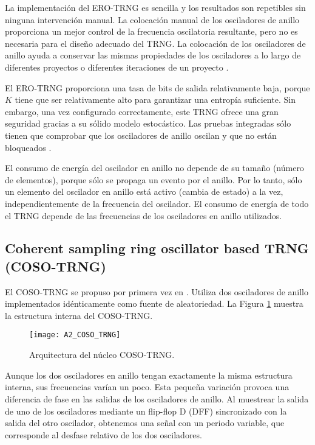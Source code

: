             La implementación del ERO-TRNG es sencilla y los resultados son repetibles sin ninguna intervención manual. La colocación manual de los osciladores de anillo proporciona un mejor control de la frecuencia oscilatoria resultante, pero no es necesaria para el diseño adecuado del TRNG. La colocación de los osciladores de anillo ayuda a conservar las mismas propiedades de los osciladores a lo largo de diferentes proyectos o diferentes iteraciones de un proyecto \cite{Choi2021}.

            El ERO-TRNG proporciona una tasa de bits de salida relativamente baja, porque $K$ tiene que ser relativamente alto para garantizar una entropía suficiente. Sin embargo, una vez configurado correctamente, este TRNG ofrece una gran seguridad gracias a su sólido modelo estocástico. Las pruebas integradas sólo tienen que comprobar que los osciladores de anillo oscilan y que no están bloqueados \cite{Bochard2010,Wold2008}.

            El consumo de energía del oscilador en anillo no depende de su tamaño (número de elementos), porque sólo se propaga un evento por el anillo. Por lo tanto, sólo un elemento del oscilador en anillo está activo (cambia de estado) a la vez, independientemente de la frecuencia del oscilador. El consumo de energía de todo el TRNG depende de las frecuencias de los osciladores en anillo utilizados.

		\subsection{Coherent sampling ring oscillator based TRNG (COSO-TRNG)}

                El COSO-TRNG se propuso por primera vez en \cite{Kohlbrenner2004}. Utiliza dos osciladores de anillo implementados idénticamente como fuente de aleatoriedad. La Figura \ref{fig:A2_COSO_TRNG} muestra la estructura interna del COSO-TRNG.
				\begin{figure}[hbtp]
					\centering
					\texttt{[image: A2\_COSO\_TRNG]}
					\caption{Arquitectura del núcleo COSO-TRNG.}
					\label{fig:A2_COSO_TRNG}
				\end{figure}

                Aunque los dos osciladores en anillo tengan exactamente la misma estructura interna, sus frecuencias varían un poco. Esta pequeña variación provoca una diferencia de fase en las salidas de los osciladores de anillo. Al muestrear la salida de uno de los osciladores mediante un flip-flop D (DFF) sincronizado con la salida del otro oscilador, obtenemos una señal con un periodo variable, que corresponde al desfase relativo de los dos osciladores.

